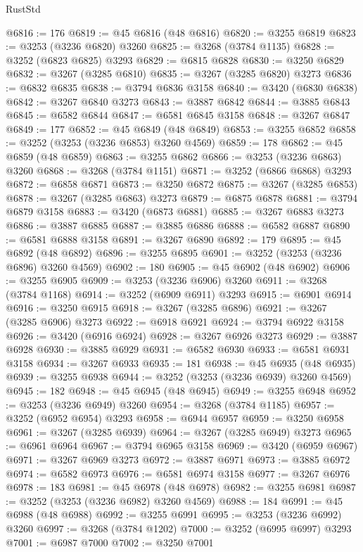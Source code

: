 \begin{lexlean}{RustStd}
\begin{coremodule}
{\begin{coremodule}
{{{{{{{{{{{{{{{{{{{{{{{{{{{{{{{{{{{{{{{@6816 := 176
@6819 := @45 @6816 (@48 @6816)
@6820 := @3255 @6819
@6823 := @3253 (@3236 @6820) @3260
@6825 := @3268 (@3784 @1135)
@6828 := @3252 (@6823 @6825) @3293
@6829 := @6815 @6828
@6830 := @3250 @6829
@6832 := @3267 (@3285 @6810)
@6835 := @3267 (@3285 @6820) @3273
@6836 := @6832 @6835
@6838 := @3794 @6836 @3158
@6840 := @3420 (@6830 @6838)
@6842 := @3267 @6840 @3273
@6843 := @3887 @6842
@6844 := @3885 @6843
@6845 := @6582 @6844
@6847 := @6581 @6845 @3158
@6848 := @3267 @6847
@6849 := 177
@6852 := @45 @6849 (@48 @6849)
@6853 := @3255 @6852
@6858 := @3252 (@3253 (@3236 @6853) @3260 @4569)
@6859 := 178
@6862 := @45 @6859 (@48 @6859)
@6863 := @3255 @6862
@6866 := @3253 (@3236 @6863) @3260
@6868 := @3268 (@3784 @1151)
@6871 := @3252 (@6866 @6868) @3293
@6872 := @6858 @6871
@6873 := @3250 @6872
@6875 := @3267 (@3285 @6853)
@6878 := @3267 (@3285 @6863) @3273
@6879 := @6875 @6878
@6881 := @3794 @6879 @3158
@6883 := @3420 (@6873 @6881)
@6885 := @3267 @6883 @3273
@6886 := @3887 @6885
@6887 := @3885 @6886
@6888 := @6582 @6887
@6890 := @6581 @6888 @3158
@6891 := @3267 @6890
@6892 := 179
@6895 := @45 @6892 (@48 @6892)
@6896 := @3255 @6895
@6901 := @3252 (@3253 (@3236 @6896) @3260 @4569)
@6902 := 180
@6905 := @45 @6902 (@48 @6902)
@6906 := @3255 @6905
@6909 := @3253 (@3236 @6906) @3260
@6911 := @3268 (@3784 @1168)
@6914 := @3252 (@6909 @6911) @3293
@6915 := @6901 @6914
@6916 := @3250 @6915
@6918 := @3267 (@3285 @6896)
@6921 := @3267 (@3285 @6906) @3273
@6922 := @6918 @6921
@6924 := @3794 @6922 @3158
@6926 := @3420 (@6916 @6924)
@6928 := @3267 @6926 @3273
@6929 := @3887 @6928
@6930 := @3885 @6929
@6931 := @6582 @6930
@6933 := @6581 @6931 @3158
@6934 := @3267 @6933
@6935 := 181
@6938 := @45 @6935 (@48 @6935)
@6939 := @3255 @6938
@6944 := @3252 (@3253 (@3236 @6939) @3260 @4569)
@6945 := 182
@6948 := @45 @6945 (@48 @6945)
@6949 := @3255 @6948
@6952 := @3253 (@3236 @6949) @3260
@6954 := @3268 (@3784 @1185)
@6957 := @3252 (@6952 @6954) @3293
@6958 := @6944 @6957
@6959 := @3250 @6958
@6961 := @3267 (@3285 @6939)
@6964 := @3267 (@3285 @6949) @3273
@6965 := @6961 @6964
@6967 := @3794 @6965 @3158
@6969 := @3420 (@6959 @6967)
@6971 := @3267 @6969 @3273
@6972 := @3887 @6971
@6973 := @3885 @6972
@6974 := @6582 @6973
@6976 := @6581 @6974 @3158
@6977 := @3267 @6976
@6978 := 183
@6981 := @45 @6978 (@48 @6978)
@6982 := @3255 @6981
@6987 := @3252 (@3253 (@3236 @6982) @3260 @4569)
@6988 := 184
@6991 := @45 @6988 (@48 @6988)
@6992 := @3255 @6991
@6995 := @3253 (@3236 @6992) @3260
@6997 := @3268 (@3784 @1202)
@7000 := @3252 (@6995 @6997) @3293
@7001 := @6987 @7000
@7002 := @3250 @7001
}}}}}}}}}}}}}}}}}}}}}}}}}}}}}}}}}}}}}}}
\end{coremodule}}
\end{coremodule}
\end{lexlean}
